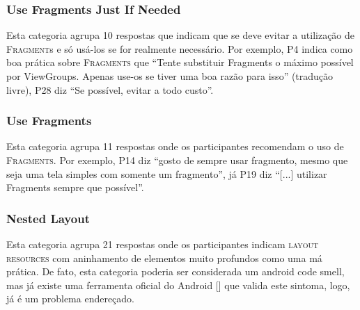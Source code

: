 \subsubsection{Use Fragments Just If Needed} 
Esta categoria agrupa 10 respostas que indicam que se deve evitar a utiliza\c{c}\~ao de \textsc{Fragment}s e s\'o us\'a-los se for realmente necess\'ario. Por exemplo, P4 indica como boa pr\'atica sobre \textsc{Fragments} que ``Tente substituir Fragments o m\'aximo poss\'ivel por ViewGroups. Apenas use-os se tiver uma boa raz\~ao para isso'' (tradu\c{c}\~ao livre), P28 diz ``Se poss\'ivel, evitar a todo custo''. 

\subsubsection{Use Fragments} 
Esta categoria agrupa 11 respostas onde os participantes recomendam o uso de \textsc{Fragments}. Por exemplo, P14 diz ``gosto de sempre usar fragmento, mesmo que seja uma tela simples com somente um fragmento'', j\'a P19 diz ``[...] utilizar Fragments sempre que poss\'ivel''. 

\subsubsection{Nested Layout} 
Esta categoria agrupa 21 respostas onde os participantes indicam \textsc{layout resources} com aninhamento de elementos muito profundos como uma m\'a pr\'atica. De fato, esta categoria poderia ser considerada um android code smell, mas j\'a existe uma ferramenta oficial do Android [] que valida este sintoma, logo, j\'a \'e um problema endere\c{c}ado.




